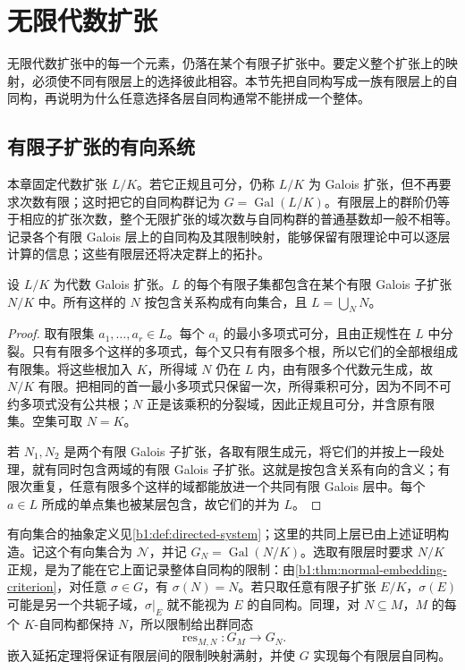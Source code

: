 
\section{无限代数扩张}
\label{b1:sec:2201}

无限代数扩张中的每一个元素，仍落在某个有限子扩张中。要定义整个扩张上的映射，必须使不同有限层上的选择彼此相容。本节先把自同构写成一族有限层上的自同构，再说明为什么任意选择各层自同构通常不能拼成一个整体。

%
%

\subsection{有限子扩张的有向系统}
\label{b1:subsec:2201:01}
本章固定代数扩张 \(L/K\)。若它正规且可分，仍称 \(L/K\) 为 Galois 扩张，但不再要求次数有限；这时把它的自同构群记为 \(G=\operatorname{Gal}(L/K)\)。有限层上的群阶仍等于相应的扩张次数，整个无限扩张的域次数与自同构群的普通基数却一般不相等。记录各个有限 Galois 层上的自同构及其限制映射，能够保留有限理论中可以逐层计算的信息；这些有限层还将决定群上的拓扑。

\begin{proposition}\label{b1:prop:finite-galois-layers}
	设 \(L/K\) 为代数 Galois 扩张。\(L\) 的每个有限子集都包含在某个有限 Galois 子扩张 \(N/K\) 中。所有这样的 \(N\) 按包含关系构成有向集合，且 \(L=\bigcup_N N\)。
\end{proposition}
\begin{proof}
	取有限集 \(a_1,\ldots,a_r\in L\)。每个 \(a_i\) 的最小多项式可分，且由正规性在 \(L\) 中分裂。只有有限多个这样的多项式，每个又只有有限多个根，所以它们的全部根组成有限集。将这些根加入 \(K\)，所得域 \(N\) 仍在 \(L\) 内，由有限多个代数元生成，故 \(N/K\) 有限。把相同的首一最小多项式只保留一次，所得乘积可分，因为不同不可约多项式没有公共根；\(N\) 正是该乘积的分裂域，因此正规且可分，并含原有限集。空集可取 \(N=K\)。

	若 \(N_1,N_2\) 是两个有限 Galois 子扩张，各取有限生成元，将它们的并按上一段处理，就有同时包含两域的有限 Galois 子扩张。这就是按包含关系有向的含义；有限次重复，任意有限多个这样的域都能放进一个共同有限 Galois 层中。每个 \(a\in L\) 所成的单点集也被某层包含，故它们的并为 \(L\)。
\end{proof}
有向集合的抽象定义见\cref{b1:def:directed-system}；这里的共同上层已由上述证明构造。记这个有向集合为 \(\mathcal N\)，并记 \(G_N=\operatorname{Gal}(N/K)\)。选取有限层时要求 \(N/K\) 正规，是为了能在它上面记录整体自同构的限制：由\cref{b1:thm:normal-embedding-criterion}，对任意 \(\sigma\in G\)，有 \(\sigma(N)=N\)。若只取任意有限子扩张 \(E/K\)，\(\sigma(E)\) 可能是另一个共轭子域，\(\sigma|_E\) 就不能视为 \(E\) 的自同构。同理，对 \(N\subseteq M\)，\(M\) 的每个 \(K\)-自同构都保持 \(N\)，所以限制给出群同态
\[
	\operatorname{res}_{M,N}:G_M\longrightarrow G_N.
\]
嵌入延拓定理将保证有限层间的限制映射满射，并使 \(G\) 实现每个有限层自同构。

